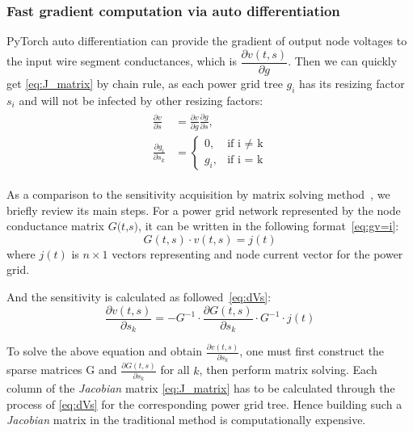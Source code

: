 \subsubsection{Fast gradient computation via auto differentiation}
PyTorch auto differentiation can provide the gradient of output node voltages to the input wire segment conductances, which is $ \dfrac{\partial v(t, s)}{\partial g}$. Then we can quickly get \eqref{eq:J_matrix} by chain rule, as each power grid tree $g_{i}$ has its resizing factor $s_{i}$ and will not be infected by other resizing factors:
\begin{equation}
	\label{eq:chain_rule}
	\begin{aligned}
	\begin{split}
	\frac{\partial v}{\partial s} & =\frac{\partial v}{\partial g} \frac{\partial g}{\partial s}, \\ 
	\frac{\partial g_{i}}{\partial s_{k}} & = 
    	\begin{cases}
        		0,      &\mbox{if i $\neq$ k} \\ 
        		g_{i},  &\mbox{if i = k} 
    	\end{cases}
	\end{split}
	\end{aligned}
\end{equation}

As a comparison to the sensitivity acquisition by matrix solving method~\cite{Sukharev:2019pg}, we briefly review its main steps.
For a power grid network represented by the node conductance matrix $ \textit{G(t,s)}$, it can be written in the following format~\eqref{eq:gv=i}:
\begin{equation}
	\label{eq:gv=i}
	G(t,s)\cdot v(t,s)= j(t)
\end{equation}
where $j(t)$  is $n\times 1$ vectors representing and node current vector for the power grid.

And the sensitivity is calculated as followed~\eqref{eq:dVs}: 
\begin{equation}
	\label{eq:dVs}
	\dfrac{\partial v(t,s)}{\partial s_{k}} = -G^{-1}\cdot \dfrac{\partial G(t,s)}{\partial s_{k}}  \cdot G^{-1}\cdot j(t)
\end{equation}

To solve the above equation and obtain $ \frac{\partial v(t,s)}{\partial s_{k}}$, one must first construct the sparse matrices G and $\frac{\partial G(t,s)}{\partial s_{k}}$ for all $k$, then perform matrix solving. 
Each column of the \textit{Jacobian} matrix \eqref{eq:J_matrix} has to be calculated through the process of \eqref{eq:dVs} for the corresponding power grid tree. Hence building such a \textit{Jacobian} matrix in the traditional method is computationally expensive.










